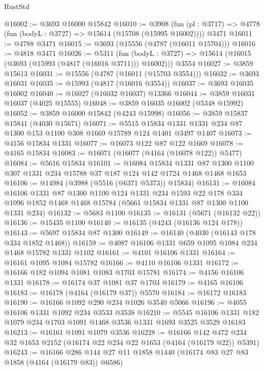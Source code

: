 \begin{lexlean}{RustStd}
\begin{coremodule}
@16002 := @3693 @16000 @15842
@16010 := @3908
    (fun (pl : @3717) => @4778 (fun (bodyL : @3727) => @15614 (@15708 (@15995 @16002))))
    @3471
@16011 := @4788 @3471
@16015 := @3693 (@15556 (@4787 (@16011 @15704)))
@16016 := @4818 @3471
@16026 := @5311
    (fun (bodyL : @3727) => @15614 (@16015 (@3693 (@15993 (@4817 (@16016 @3711))) @16002)))
    @3554
@16027 := @3859 @15613
@16031 := @15556 (@4787 (@16011 (@15703 @3554)))
@16032 := @3693 @16031
@16035 := @15993 (@4817 (@16016 @3554))
@16037 := @3693 @16035 @16002
@16040 := @16027 (@16032 @16037) @13366
@16044 := @3859 @16031 @16037 (@4025 @15555)
@16048 := @3859 @16035 @16002 (@5348 @15992)
@16052 := @3859 @16000 @15842 (@4243 @15998)
@16056 := @3859 @15837 @15841 (@4030 @15671)
@16071 := @5515
    @15834
    @1331
    @1331
    @234
    @87
    @1300
    @153
    @1100
    @308
    @1669
    @15789
    @124
    @1401
    @3497
    @1407
@16073 := @4156 @15834 @1331
@16077 := @16073 @122 @87 @122 @1669
@16078 := @4165 @15834
@16083 := @16071 (@16077 (@4164 (@16078 @122)) @5477)
@16084 := @5616 @15834
@16101 := @16084
    @15834
    @1331
    @87
    @1300
    @1100
    @307
    @1331
    @234
    @15788
    @37
    @187
    @124
    @142
    @1724
    @1468
    @1468
    @1653
@16106 := @14984 (@3988 (@5516 (@6371 @5373)) @15834)
@16131 := @16084
    @16106
    @1331
    @87
    @1300
    @1100
    @124
    @1331
    @234
    @1593
    @22
    @178
    @334
    @1096
    @1852
    @1468
    @1468
    @15784
    (@5661 @15834 @1331 @87 @1300 @1100 @1331 @234)
@16132 := @5683 @1100
@16135 := @16131 (@5671 (@16132 @22))
@16136 := @15435 @1100
@16140 := @16135 (@4243 (@16136 @124 @178))
@16143 := @5697 @15834 @87 @1300
@16149 := @16140 (@4030 (@16143 @178 @334 @1852 @1468))
@16159 := @4087 @16106 @1331 @659 @1095 @1084 @234 @1468 @15782 @1331 @1102
@16161 := @4101 @16106 @1331
@16164 := @16161 @1095 @1084 @15782
@16166 := @4110 @16106 @1331
@16172 := @16166 @182 @1094 @1081 @1083 @1703 @15781
@16174 := @4156 @16106 @1331
@16178 := @16174 @37 @1081 @37 @1703
@16179 := @4165 @16106
@16183 := @16178 (@4164 (@16179 @37)) @5570
@16184 := @16172 @16183
@16190 := @16166 @1092 @290 @234 @1026 @3540 @5066
@16196 := @4055 @16106 @1331 @1092 @234 @3533 @3538
@16210 := @5545 @16106 @1331 @182 @1079 @234 @1703 @1091 @1468 @3536 @1331 @1693 @3525 @3529 @16183
@16213 := @16161 @1091 @1079 @3536
@16228 := @16166
    @142
    @472
    @234
    @32
    @1653
    @2152
    (@16174 @22 @234 @22 @1653 (@4164 (@16179 @22)) @5391)
@16243 := @16166 @286 @144 @27 @11 @1858 @1440 (@16174 @83 @27 @83 @1858 (@4164 (@16179 @83)) @6586)

\end{coremodule}
\end{lexlean}
